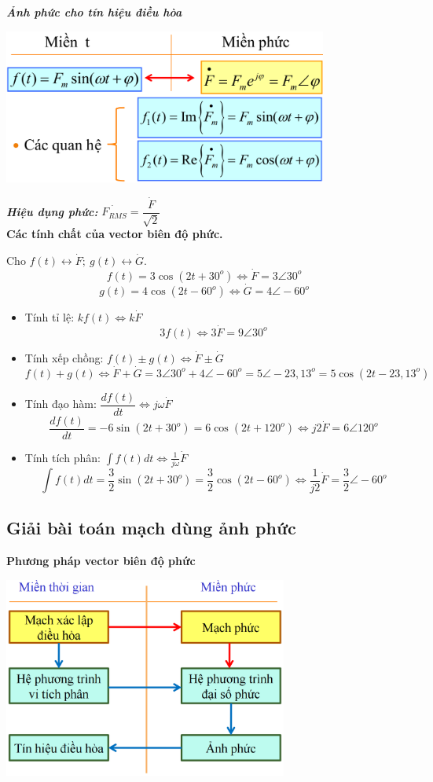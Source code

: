 \textit{\textbf{Ảnh phức cho tín hiệu điều hòa}}
\begin{center}
    \includegraphics[width = 0.8\textwidth]{./image/34.png}
\end{center}

\textit{\textbf{Hiệu dụng phức:}} $\dot{F_{RMS}} = \dfrac{\dot{F}}{\sqrt{2}}$\\
\textbf{Các tính chất của vector biên độ phức.}

Cho $ f(t) \longleftrightarrow \dot F;\  g(t) \longleftrightarrow \dot G$.
\[
    f(t) = 3\cos (2t + 30^o) \Leftrightarrow \dot F = 3 \angle 30^o
\]
\[
    g(t) = 4\cos(2t - 60^o )\Leftrightarrow \dot G = 4 \angle -60^o
\]
\begin{itemize}
    \item Tính tỉ lệ: $kf(t) \Leftrightarrow k\dot F$
        \[
            3f(t) \Leftrightarrow 3\dot F = 9 \angle 30^o
        \]
    \item Tính xếp chồng: $f(t) \pm g(t) \Leftrightarrow \dot F \pm \dot G$
    \[
        f(t) + g(t) \Leftrightarrow \dot F + \dot G = 3 \angle 30^o + 4 \angle -60^o = 5 \angle -23,13^o = 5\cos (2t - 23,13^o)
    \]
    \item Tính đạo hàm: $\dfrac{df(t)}{dt} \Leftrightarrow j \omega \dot{F}$
        \[
            \frac{df(t)}{dt} = -6\sin (2t + 30^o) = 6\cos (2t+120^o) \Leftrightarrow j2\dot{F} = 6\angle 120^o
        \]
    \item Tính tích phân: $\displaystyle \int f(t)dt \Leftrightarrow \frac{1}{j\omega}\dot{F}$
        \[
            \int f(t)dt = \frac{3}{2}\sin (2t+30^o) = \frac{3}{2}\cos(2t-60^o) \Leftrightarrow \frac{1}{j2}\dot{F} = \frac{3}{2}\angle -60^o
        \]
\end{itemize}
\subsection{Giải bài toán mạch dùng ảnh phức}
\textbf{Phương pháp vector biên độ phức}
\begin{center}
    \includegraphics[width = 0.7\textwidth]{./image/36.png}
\end{center}
